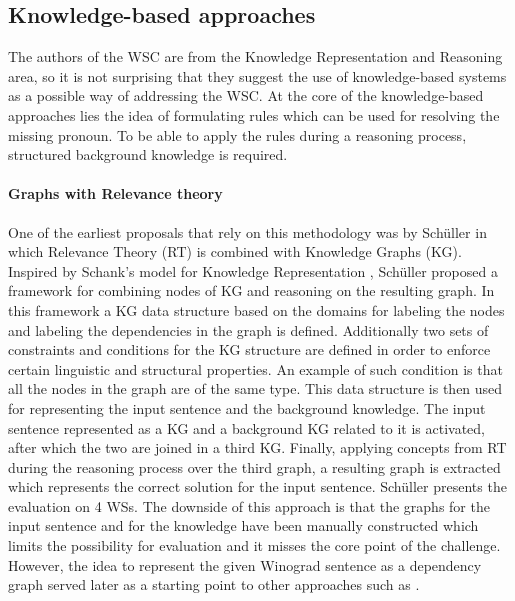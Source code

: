 \subsection{Knowledge-based approaches}
The authors of the WSC are from the Knowledge Representation and Reasoning area, so it is not surprising that they suggest the use of knowledge-based systems as a possible way of addressing the WSC. At the core of the knowledge-based approaches lies the idea of formulating rules which can be used for resolving the missing pronoun. To be able to apply the rules during a reasoning process, structured background knowledge is required.

\paragraph{Graphs with Relevance theory}
One of the earliest proposals that rely on this methodology was by Sch{\"u}ller \cite{DBLP:conf/kr/Schuller14} in which Relevance Theory (RT) \cite{Wilson2002-WILRT} is combined with Knowledge Graphs (KG). Inspired by Schank's model for Knowledge Representation \cite{SCHANK1972552}, Sch{\"u}ller proposed a framework for combining nodes of KG and reasoning on the resulting graph. 
In this framework a KG data structure based on the domains for labeling the nodes and labeling the dependencies in the graph is defined. Additionally two sets of constraints and conditions for the KG structure are defined in order to enforce certain linguistic and structural properties. An example of such condition is that all the nodes in the graph are of the same type.  This data structure is then used for representing the input sentence and the background knowledge. 
The input sentence represented as a KG and a background KG related to it is activated, after which the two are joined in a third KG. Finally, applying concepts from RT during the reasoning process over the third graph, a resulting graph is extracted which represents the correct solution for the input sentence. Sch{\"u}ller \cite{DBLP:conf/kr/Schuller14} presents the evaluation on 4 WSs. The downside of this approach is that the graphs for the input sentence and for the knowledge have been manually constructed which limits the possibility for evaluation and it misses the core point of the challenge. However, the idea to represent the given Winograd sentence as a dependency graph served later as a starting point to other approaches such as \cite{DBLP:conf/ijcai/SharmaVAB15}.

